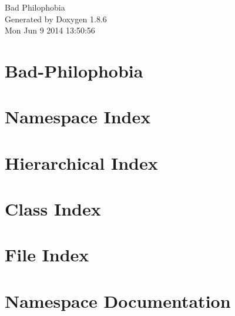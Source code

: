 \documentclass[twoside]{book}
\newcommand{\clearemptydoublepage}{%
  \newpage{\pagestyle{empty}\cleardoublepage}%
}
\begin{document}
\hypersetup{pageanchor=false}
\begin{titlepage}
\vspace*{7cm}
\begin{center}%
{\Large Bad Philophobia }\\
\vspace*{1cm}
{\large Generated by Doxygen 1.8.6}\\
\vspace*{0.5cm}
{\small Mon Jun 9 2014 13:50:56}\\
\end{center}
\end{titlepage}
\clearemptydoublepage
\tableofcontents
\clearemptydoublepage
{}
\hypersetup{pageanchor=true}

\chapter{Bad-\/\-Philophobia}
\label{md_README}
\hypertarget{md_README}{}

\chapter{Namespace Index}

\chapter{Hierarchical Index}

\chapter{Class Index}

\chapter{File Index}

\chapter{Namespace Documentation}







\end{document}
